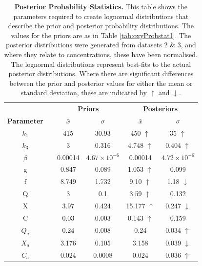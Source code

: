 \begin{table}[tbp]%
\renewcommand{\arraystretch}{1.5}
\begin{center}
\begin{tabular}{cccccc}
\toprule
& & \multicolumn{2}{c}{\textbf{Priors}} & \multicolumn{2}{c}{\textbf{Posteriors}} \\
\textbf{Parameter} && ${\bar{x}}$ & $\sigma$ & ${\bar{x}}$ & $\sigma$\\
\midrule
$k_1$ && 415 & 30.93 & 450 $\uparrow$ & 35 $\uparrow$\\
$k_3$ && 3 & 0.316 & 4.748 $\uparrow$ & 0.404 $\uparrow$\\
$\beta$ && 0.00014 & $4.67\times 10^{-6}$ & 0.00014 & $4.72\times 10^{-6}$\\
g && 0.847 & 0.089 & 1.053 $\uparrow$ & 0.099\\
f && 8.749 & 1.732 & 9.10 $\uparrow$ & 1.18 $\downarrow$\\
Q && 3 & 0.1 & 3.59 $\uparrow$ & 0.132\\
X && 3.97 & 0.424 & 15.177 $\uparrow$ & 0.247 $\downarrow$\\
C && 0.03 & 0.003 & 0.143 $\uparrow$ & 0.159\\
$Q_a$ && 0.24 & 0.008 & 0.24 & 0.034 $\uparrow$\\
$X_a$ && 3.176 & 0.105 & 3.158 & 0.039 $\downarrow$\\
$C_a$ && 0.024 & 0.0008 & 0.024 & 0.036 $\uparrow$\\
\bottomrule
\end{tabular}
\end{center}
\caption[Posterior Probability Statistics]{{\bf Posterior Probability Statistics.} This table shows the parameters required to create lognormal distributions that describe the prior and posterior probability distributions. The values for the priors are as in Table \ref{tab:oxyProbstat1}. The posterior distributions were generated from datasets 2 \& 3, and where they relate to concentrations, these have been normalised. The lognormal distributions represent best-fits to the actual posterior distributions. Where there are significant differences between the prior and posterior values for either the mean or standard deviation, these are indicated by $\uparrow$ and $\downarrow$.
\label{tab:oxyPstat}}
\end{table}

